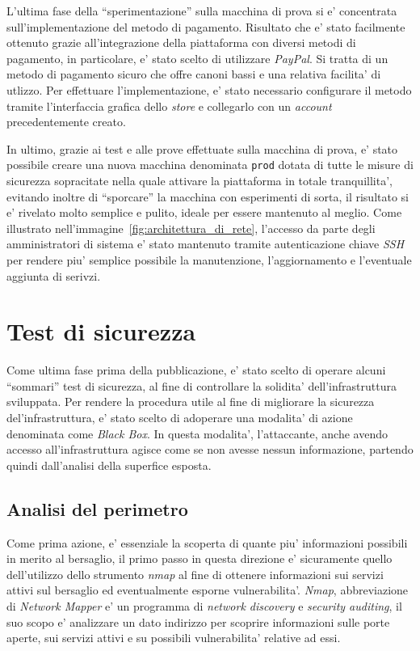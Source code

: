 \documentclass[a4paper]{report}
\newcommand{\quotes}[1]{``#1''}
\begin{document}
		L'ultima fase della \quotes{sperimentazione} sulla macchina di prova si e' concentrata sull'implementazione del
		metodo di pagamento. Risultato che e' stato facilmente ottenuto grazie all'integrazione della piattaforma con
		diversi metodi di pagamento, in particolare, e' stato scelto di utilizzare \emph{PayPal}. Si tratta di un metodo
		di pagamento sicuro che offre canoni bassi e una relativa facilita' di utlizzo. Per effettuare
		l'implementazione, e' stato necessario configurare il metodo tramite l'interfaccia grafica dello \emph{store} e
		collegarlo con un \emph{account} precedentemente creato.

		In ultimo, grazie ai test e alle prove effettuate sulla macchina di prova, e' stato possibile creare una nuova
		macchina denominata \texttt{prod} dotata di tutte le misure di sicurezza sopracitate nella quale attivare la
		piattaforma in totale tranquillita', evitando inoltre di \quotes{sporcare} la macchina con esperimenti di sorta,
		il risultato si e' rivelato molto semplice e pulito, ideale per essere mantenuto al meglio. Come illustrato
		nell'immagine~\ref{fig:architettura_di_rete}, l'accesso da parte degli amministratori di sistema e' stato
		mantenuto tramite autenticazione chiave \emph{SSH} per rendere piu' semplice possibile la manutenzione,
		l'aggiornamento e l'eventuale aggiunta di serivzi.
	\section{Test di sicurezza}\label{test_di_sicurezza}
		Come ultima fase prima della pubblicazione, e' stato scelto di operare alcuni \quotes{sommari} test di
		sicurezza, al fine di controllare la solidita' dell'infrastruttura sviluppata.
		Per rendere la procedura utile al fine di migliorare la sicurezza del'infrastruttura, e' stato scelto di
		adoperare una modalita' di azione denominata come \emph{Black Box}. In questa modalita', l'attaccante, anche
		avendo accesso all'infrastruttura agisce come se non avesse nessun informazione, partendo quindi dall'analisi
		della superfice esposta.
		\subsection{Analisi del perimetro}\label{analisi_del_perimetro}
			Come prima azione, e' essenziale la scoperta di quante piu' informazioni possibili in merito al bersaglio,
			il primo passo in questa direzione e' sicuramente quello dell'utilizzo dello strumento \emph{nmap} al fine
			di ottenere informazioni sui servizi attivi sul bersaglio ed eventualmente esporne vulnerabilita'.
			\emph{Nmap}\label{nmap}, abbreviazione di \emph{Network Mapper} e' un programma di \emph{network discovery}
			e \emph{security auditing}, il suo scopo e' analizzare un dato indirizzo per scoprire informazioni sulle
			porte aperte, sui servizi attivi e su possibili vulnerabilita' relative ad essi.
\end{document}
